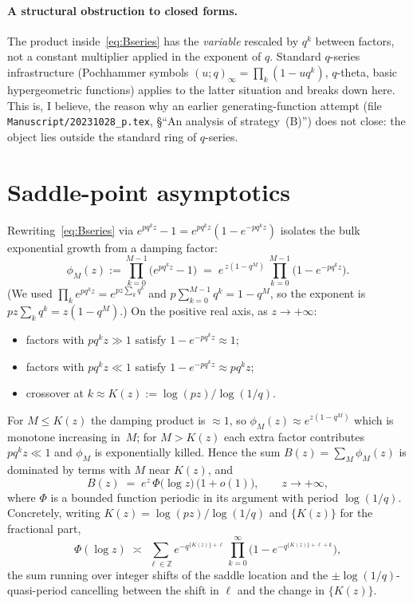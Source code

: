 \documentclass[11pt]{article}
\theoremstyle{definition}
\begin{document}
\paragraph{A structural obstruction to closed forms.} The product
inside~\eqref{eq:Bseries} has the \emph{variable} rescaled by $q^k$
between factors, not a constant multiplier applied in the exponent of
$q$. Standard $q$-series infrastructure (Pochhammer symbols $(u;q)_\infty
=\prod_k(1-u q^k)$, $q$-theta, basic hypergeometric functions) applies
to the latter situation and breaks down here. This is, I believe, the
reason why an earlier generating-function attempt (file
\texttt{Manuscript/20231028\_p.tex}, \S``An analysis of strategy~(B)'')
does not close: the object lies outside the standard ring of $q$-series.

\section{Saddle-point asymptotics}\label{sec:saddle}

Rewriting~\eqref{eq:Bseries} via $e^{pq^kz}-1 = e^{pq^kz}(1-e^{-pq^kz})$
isolates the bulk exponential growth from a damping factor:
\begin{equation}\label{eq:phi}
  \phi_M(z) := \prod_{k=0}^{M-1}\bigl(e^{pq^kz}-1\bigr)
  \;=\; e^{\,z(1-q^M)}\,\prod_{k=0}^{M-1}\!\bigl(1-e^{-pq^kz}\bigr).
\end{equation}
(We used $\prod_k e^{pq^kz}=e^{pz\sum_k q^k}$ and
$p\sum_{k=0}^{M-1}q^k = 1-q^M$, so the exponent is $pz\sum_k q^k=z(1-q^M)$.)
On the
positive real axis, as $z\to+\infty$:
\begin{itemize}[leftmargin=2em]
  \item factors with $pq^kz\gg1$ satisfy $1-e^{-pq^kz}\approx 1$;
  \item factors with $pq^kz\ll1$ satisfy $1-e^{-pq^kz}\approx pq^kz$;
  \item crossover at $k\approx K(z):=\log(pz)/\log(1/q)$.
\end{itemize}
For $M\le K(z)$ the damping product is $\approx 1$, so $\phi_M(z)
\approx e^{z(1-q^M)}$ which is monotone increasing in~$M$; for $M>K(z)$
each extra factor contributes $pq^kz \ll 1$ and $\phi_M$ is exponentially
killed. Hence the sum $B(z)=\sum_M\phi_M(z)$ is dominated by terms with
$M$ near $K(z)$, and
\begin{equation}\label{eq:Basymp}
  B(z) \;=\; e^{z}\,\Phi\!\bigl(\log z\bigr)\,\bigl(1+o(1)\bigr),
  \qquad z\to+\infty,
\end{equation}
where $\Phi$ is a bounded function periodic in its argument with period
$\log(1/q)$. Concretely, writing $K(z)=\log(pz)/\log(1/q)$ and
$\{K(z)\}$ for the fractional part,
\begin{equation}\label{eq:Phi-def}
  \Phi(\log z) \;\asymp\;
  \sum_{\ell\in\mathbb{Z}}
    e^{-q^{\{K(z)\}+\ell}}\,
    \prod_{k=0}^{\infty}\!
      \bigl(1-e^{-q^{\{K(z)\}+\ell+k}}\bigr),
\end{equation}
the sum running over integer shifts of the saddle location and the
$\pm\log(1/q)$-quasi-period cancelling between the shift in $\ell$ and
the change in $\{K(z)\}$.
\end{document}

